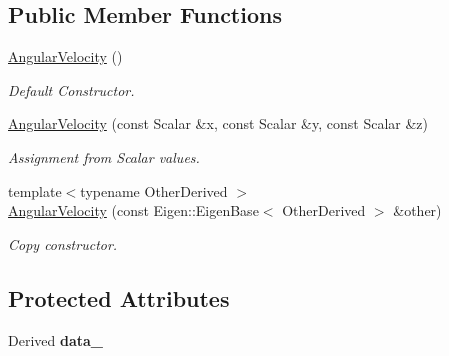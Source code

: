 \subsection*{Public Member Functions}
\begin{DoxyCompactItemize}
\item 
\hyperlink{classow__core_1_1AngularVelocity_a4646f848b302b5b4396f5b9a51ffbf8e}{Angular\+Velocity} ()\hypertarget{classow__core_1_1AngularVelocity_a4646f848b302b5b4396f5b9a51ffbf8e}{}\label{classow__core_1_1AngularVelocity_a4646f848b302b5b4396f5b9a51ffbf8e}

\begin{DoxyCompactList}\small\item\em Default Constructor. \end{DoxyCompactList}\item 
\hyperlink{classow__core_1_1AngularVelocity_ad30b2ef68b80c738d78e7898cb017412}{Angular\+Velocity} (const Scalar \&x, const Scalar \&y, const Scalar \&z)\hypertarget{classow__core_1_1AngularVelocity_ad30b2ef68b80c738d78e7898cb017412}{}\label{classow__core_1_1AngularVelocity_ad30b2ef68b80c738d78e7898cb017412}

\begin{DoxyCompactList}\small\item\em Assignment from Scalar values. \end{DoxyCompactList}\item 
{\footnotesize template$<$typename Other\+Derived $>$ }\\\hyperlink{classow__core_1_1AngularVelocity_a711e58379cd2a989339dfd583c9ca999}{Angular\+Velocity} (const Eigen\+::\+Eigen\+Base$<$ Other\+Derived $>$ \&other)
\begin{DoxyCompactList}\small\item\em Copy constructor. \end{DoxyCompactList}\end{DoxyCompactItemize}
\subsection*{Protected Attributes}
\begin{DoxyCompactItemize}
\item 
Derived {\bfseries data\+\_\+}\hypertarget{classow__core_1_1AngularVelocity_acf41236c893aea3624734214dab971ae}{}\label{classow__core_1_1AngularVelocity_acf41236c893aea3624734214dab971ae}

\end{DoxyCompactItemize}


